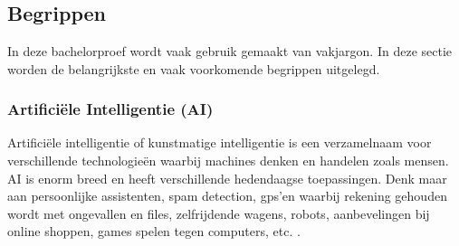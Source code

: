 
\chapter{}
\label{ch:inleiding}

%

\section{Begrippen}
\label{sec:begrippen}

In deze bachelorproef wordt vaak gebruik gemaakt van vakjargon. In deze sectie worden de belangrijkste en vaak voorkomende begrippen uitgelegd.

\subsection{Artificiële Intelligentie (AI)}
\label{subsec:begrippen-ai}

Artificiële intelligentie of kunstmatige intelligentie is een verzamelnaam voor verschillende technologieën waarbij machines denken en handelen zoals mensen. AI is enorm breed en heeft verschillende hedendaagse toepassingen. Denk maar aan persoonlijke assistenten, spam detection, gps’en waarbij rekening gehouden wordt met ongevallen en files, zelfrijdende wagens, robots, aanbevelingen bij online shoppen, games spelen tegen computers, etc. \autocite{Fagella2020}.

